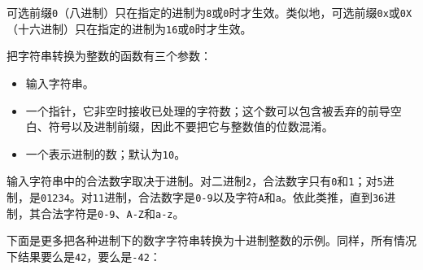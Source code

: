 
可选前缀\texttt{0}（八进制）只在指定的进制为\texttt{8}或\texttt{0}时才生效。类似地，可选前缀\texttt{0x}或\texttt{0X}（十六进制）只在指定的进制为\texttt{16}或\texttt{0}时才生效。



把字符串转换为整数的函数有三个参数：



\begin{itemize}
\item 输入字符串。



\item 一个指针，它非空时接收已处理的字符数；这个数可以包含被丢弃的前导空白、符号以及进制前缀，因此不要把它与整数值的位数混淆。



\item 一个表示进制的数；默认为\texttt{10}。

\end{itemize}



输入字符串中的合法数字取决于进制。对二进制\texttt{2}，合法数字只有\texttt{0}和\texttt{1}；对\texttt{5}进制，是\texttt{01234}。对\texttt{11}进制，合法数字是\texttt{0-\allowbreak{}9}以及字符\texttt{A}和\texttt{a}。依此类推，直到\texttt{36}进制，其合法字符是\texttt{0-\allowbreak{}9}、\texttt{A-\allowbreak{}Z}和\texttt{a-\allowbreak{}z}。



下面是更多把各种进制下的数字字符串转换为十进制整数的示例。同样，所有情况下结果要么是\texttt{42}，要么是\texttt{-\allowbreak{}42}：



